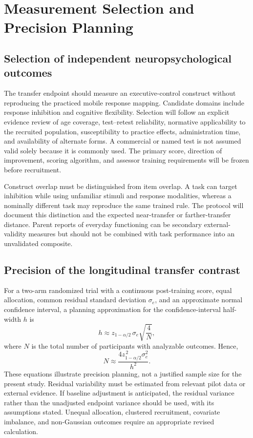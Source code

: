 \section{Measurement Selection and Precision Planning}

\subsection{Selection of independent neuropsychological outcomes}
The transfer endpoint should measure an executive-control construct without reproducing the practiced mobile response mapping. Candidate domains include response inhibition and cognitive flexibility. Selection will follow an explicit evidence review of age coverage, test--retest reliability, normative applicability to the recruited population, susceptibility to practice effects, administration time, and availability of alternate forms. A commercial or named test is not assumed valid solely because it is commonly used. The primary score, direction of improvement, scoring algorithm, and assessor training requirements will be frozen before recruitment.

Construct overlap must be distinguished from item overlap. A task can target inhibition while using unfamiliar stimuli and response modalities, whereas a nominally different task may reproduce the same trained rule. The protocol will document this distinction and the expected near-transfer or farther-transfer distance. Parent reports of everyday functioning can be secondary external-validity measures but should not be combined with task performance into an unvalidated composite.

\subsection{Precision of the longitudinal transfer contrast}
For a two-arm randomized trial with a continuous post-training score, equal allocation, common residual standard deviation \(\sigma_e\), and an approximate normal confidence interval, a planning approximation for the confidence-interval half-width \(h\) is
\[
h \approx z_{1-\alpha/2}\,\sigma_e\sqrt{\frac{4}{N}},
\]
where \(N\) is the total number of participants with analyzable outcomes. Hence,
\[
N \approx \frac{4z_{1-\alpha/2}^{\,2}\sigma_e^2}{h^2}.
\]
These equations illustrate precision planning, not a justified sample size for the present study. Residual variability must be estimated from relevant pilot data or external evidence. If baseline adjustment is anticipated, the residual variance rather than the unadjusted endpoint variance should be used, with its assumptions stated. Unequal allocation, clustered recruitment, covariate imbalance, and non-Gaussian outcomes require an appropriate revised calculation.

